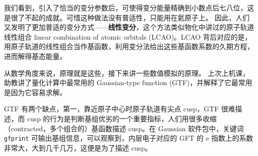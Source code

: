我们看到，引入了恰当的变分参数后，可使得变分能量精确到小数点后七八位，这是很了不起的成就。可惜这种做法没有普适性，只能用在氦原子上。
因此，人们又发明了更加普适的变分方式——\textbf{线性变分}，这个方法类似物化中讲过的原子轨道线性组合 linear combination of atomic orbitals (LCAO)。LCAO 背后对应的是，用原子轨道的线性组合当作基函数，利用变分法给出这些基函数系数的久期方程，进而解得基态能量。

从数学角度来说，原理就是这些，接下来讲一些数值模拟的原理。
上次上机课，助教讲了量化计算中最常用的 Gaussian-type function (GTF)，并解释了它最常用是因为它容易求解。

GTF 有两个缺点，第一，靠近原子中心时原子轨道有尖点 cusp，GTF 很难描述，而 cusp 的行为是判断基组优劣的一个重要指标，人们用很多收缩（contracted，多个组合的）基函数描述 cusp。在 Gaussian 软件包中，关键词 \texttt{gfprint} 可输出基组信息，可以观察到，内层电子对应的 GFT 的 e 指数上的系数非常大，大到几千几万，这便是为了描述 cusp。

